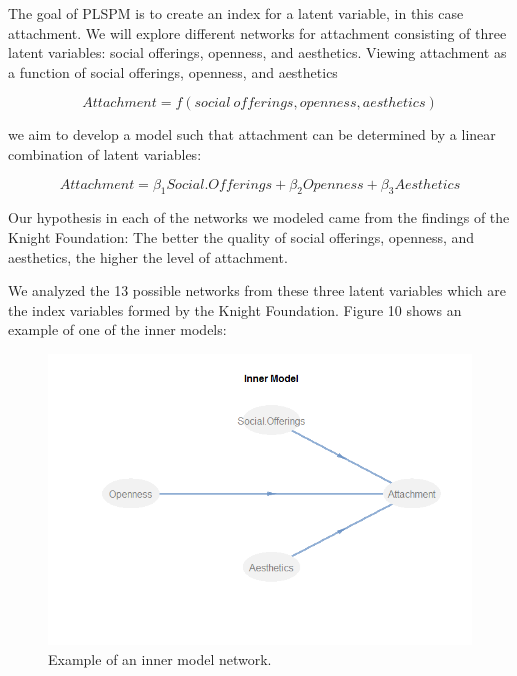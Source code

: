 \documentclass[11pt]{asaproc}
\begin{document}
The goal of PLSPM is to create an index for a latent variable, in this
case attachment. We will explore different networks for attachment
consisting of three latent variables: social offerings, openness, and
aesthetics. Viewing attachment as a function of social offerings,
openness, and aesthetics

\begin{equation}
Attachment = f(social \ \mathit{offerings}, openness, aesthetics)
\end{equation}

we aim to develop a model such that attachment can be determined by a
linear combination of latent variables: 

\begin{equation}
Attachment = \beta_{1}\mathit{Social.Offerings} + \beta_{2}Openness +
\beta_{3}Aesthetics
\end{equation}

Our hypothesis in each of the networks we modeled came from the
findings of the Knight Foundation: The better the quality of social
offerings, openness, and aesthetics, the higher the level of
attachment. 

We analyzed the 13 possible networks from these three latent variables
which are the index variables formed by the Knight Foundation. Figure
10 shows an example of one of the inner models: 

\begin{figure}[H]
\begin{center}
\includegraphics[width=\textwidth]{InnerModel.png}
\caption{Example of an inner model network.}
\label{fig:InnerModel}
\end{center}
\end{figure}
\end{document}
